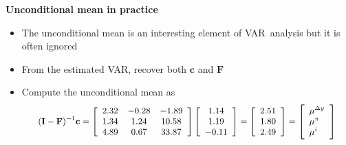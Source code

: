 \documentclass[10pt,handout]{beamer}
\begin{document}
\begin{frame}
{\textbf{Unconditional mean in practice}}

\begin{itemize}
\item The unconditional mean is an interesting element of VAR\ analysis but
it is often ignored\medskip \pause

\item From the estimated VAR, recover both $\mathbf{c}$ and $\mathbf{F}$%
\medskip

\item Compute the unconditional mean as 
\begin{equation*}
{\small 
\begin{array}{c}
\mathbf{(I-\mathbf{F})}^{-1}\mathbf{c}=\left[ 
\begin{array}{ccc}
2.32 & -0.28 & -1.89 \\ 
1.34 & 1.24 & 10.58 \\ 
4.89 & 0.67 & 33.87%
\end{array}%
\right] \left[ 
\begin{array}{c}
1.14 \\ 
1.19 \\ 
-0.11%
\end{array}%
\right] =\left[ 
\begin{array}{c}
2.51 \\ 
1.80 \\ 
2.49%
\end{array}%
\right] =\left[ 
\begin{array}{l}
\mu ^{\Delta y} \\ 
\mu ^{\pi } \\ 
\mu ^{i}%
\end{array}%
\right]%
\end{array}%
}
\end{equation*}
\end{itemize}
\end{frame}

\vspace{.1cm}
\end{document}

